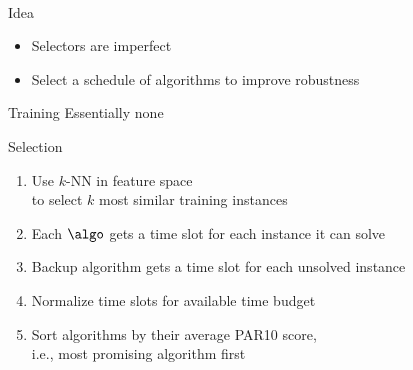 % 
% 
% 
\begin{frame}[c]{\sunny~}

\begin{block}{Idea}
\begin{itemize}
  \item Selectors are imperfect
  \item Select a schedule of algorithms to improve robustness
\end{itemize}
\end{block}

\pause

\begin{block}{Training}
Essentially none
\end{block}

\pause

\begin{block}{Selection}
\begin{enumerate}
  \item Use $k$-NN in feature space\\ to select $k$ most similar training instances
  \pause
  \item Each $\algo$ gets a time slot for each instance it can solve
  \pause
  \item Backup algorithm gets a time slot for each unsolved instance
  \pause
  \item Normalize time slots for available time budget
  \pause
  \item Sort algorithms by their average PAR10 score,\\
  		i.e., most promising algorithm first
\end{enumerate}
\end{block}

\end{frame}
